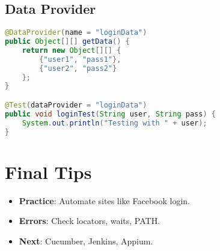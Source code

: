 \documentclass[a4paper,12pt]{article}
\begin{document}
\subsection{Data Provider}
\begin{lstlisting}[language=Java]
@DataProvider(name = "loginData")
public Object[][] getData() {
    return new Object[][] {
        {"user1", "pass1"},
        {"user2", "pass2"}
    };
}

@Test(dataProvider = "loginData")
public void loginTest(String user, String pass) {
    System.out.println("Testing with " + user);
}
\end{lstlisting}

\section{Final Tips}

\begin{itemize}
    \item \textbf{Practice}: Automate sites like Facebook login.
    \item \textbf{Errors}: Check locators, waits, PATH.
    \item \textbf{Next}: Cucumber, Jenkins, Appium.
\end{itemize}
\end{document}
